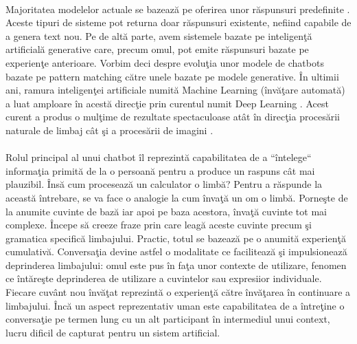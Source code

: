 \paragraph{}
Majoritatea modelelor actuale se bazeaz\u a pe oferirea unor r\u aspunsuri predefinite \cite{chatbot-models}. Aceste tipuri de sisteme pot returna doar r\u aspunsuri existente, nefiind capabile de a genera text nou. Pe de alt\u a parte, avem sistemele bazate pe inteligen\c t\u a artificial\u a generative \cite{chatbot-models} care, precum omul, pot emite r\u aspunsuri bazate pe experien\c te anterioare. Vorbim deci despre evolu\c tia unor modele de chatbots bazate pe pattern matching c\u atre unele bazate pe modele generative. \^ In ultimii ani, ramura inteligen\c tei artificiale numit\u a Machine Learning  (\^ inv\u a\c tare automat\u a) a luat amploare \^ in acest\u a direc\c tie prin curentul numit Deep Learning \cite{Goodfellow-et-al-2016}. Acest curent a produs o mul\c time de rezultate spectaculoase at\^ at \^ in direc\c tia proces\u arii naturale de limbaj c\^ at \c si a proces\u arii de imagini \cite{deep-learning-advancements}.

\paragraph{}
Rolul principal al unui chatbot \^ il reprezint\u a capabilitatea de a ``\^ intelege`` informa\c tia primit\u a de la o persoan\u a pentru a produce un raspuns c\^ at mai plauzibil. \^ Ins\u a cum proceseaz\u a un calculator o limb\u a? Pentru a r\u aspunde la aceast\u a \^ intrebare, se va face o analogie la cum \^ inva\c t\u a un om o limb\u a. Porne\c ste de la anumite cuvinte de baz\u a iar apoi pe baza acestora, \^ inva\c t\u a cuvinte tot mai complexe. \^ Incepe s\u a creeze fraze prin care leag\u a aceste cuvinte precum \c si gramatica specific\u a limbajului. Practic, totul se bazeaz\u a pe o anumit\u a experien\c t\u a cumulativ\u a. Conversa\c tia devine astfel o modalitate ce faciliteaz\u a \c si impulsioneaz\u a deprinderea limbajului: omul este pus \^ in fa\c ta unor contexte de utilizare, fenomen ce \^ int\u are\c ste deprinderea de utilizare a cuvintelor sau expresiior individuale. Fiecare cuv\^ ant nou \^ inv\u a\c tat reprezint\u a o experien\c t\u a c\u atre \^ inv\u a\c tarea \^ in continuare a limbajului. \^ Inc\u a un aspect reprezentativ uman este capabilitatea de a \^ intre\c tine o conversa\c tie pe termen lung cu un alt participant \^ in intermediul unui context, lucru dificil de capturat pentru un sistem artificial.


